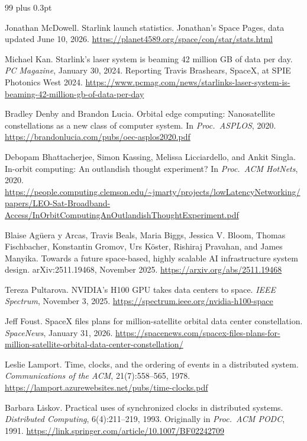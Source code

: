 \documentclass[twocolumn,10pt]{article}
\begin{document}
\small
\begin{thebibliography}{99}
\itemsep 1pt plus 0.3pt

Jonathan McDowell.
Starlink launch statistics.
Jonathan's Space Pages, data updated June 10, 2026.
\url{https://planet4589.org/space/con/star/stats.html}

Michael Kan.
Starlink's laser system is beaming 42 million GB of data per day.
\textit{PC Magazine}, January 30, 2024. Reporting Travis Brashears, SpaceX, at SPIE Photonics West 2024.
\url{https://www.pcmag.com/news/starlinks-laser-system-is-beaming-42-million-gb-of-data-per-day}

Bradley Denby and Brandon Lucia.
Orbital edge computing: Nanosatellite constellations as a new class of computer system.
In \textit{Proc.\ ASPLOS}, 2020.
\url{https://brandonlucia.com/pubs/oec-asplos2020.pdf}

Debopam Bhattacherjee, Simon Kassing, Melissa Licciardello, and Ankit Singla.
In-orbit computing: An outlandish thought experiment?
In \textit{Proc.\ ACM HotNets}, 2020.
\url{https://people.computing.clemson.edu/~jmarty/projects/lowLatencyNetworking/papers/LEO-Sat-Broadband-Access/InOrbitComputingAnOutlandishThoughtExperiment.pdf}

Blaise Ag\"uera y Arcas, Travis Beals, Maria Biggs, Jessica V. Bloom, Thomas Fischbacher, Konstantin Gromov, Urs K\"oster, Rishiraj Pravahan, and James Manyika.
Towards a future space-based, highly scalable AI infrastructure system design.
arXiv:2511.19468, November 2025.
\url{https://arxiv.org/abs/2511.19468}

Tereza Pultarova.
NVIDIA's H100 GPU takes data centers to space.
\textit{IEEE Spectrum}, November 3, 2025.
\url{https://spectrum.ieee.org/nvidia-h100-space}

Jeff Foust.
SpaceX files plans for million-satellite orbital data center constellation.
\textit{SpaceNews}, January 31, 2026.
\url{https://spacenews.com/spacex-files-plans-for-million-satellite-orbital-data-center-constellation/}

Leslie Lamport.
Time, clocks, and the ordering of events in a distributed system.
\textit{Communications of the ACM}, 21(7):558--565, 1978.
\url{https://lamport.azurewebsites.net/pubs/time-clocks.pdf}

Barbara Liskov.
Practical uses of synchronized clocks in distributed systems.
\textit{Distributed Computing}, 6(4):211--219, 1993. Originally in \textit{Proc.\ ACM PODC}, 1991.
\url{https://link.springer.com/article/10.1007/BF02242709}


\end{thebibliography}
\end{document}
